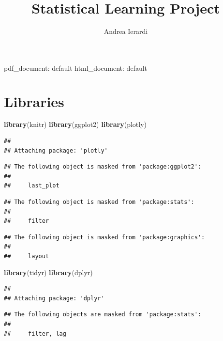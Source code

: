 \documentclass[
]{article}
\title{Statistical Learning Project}
\author{Andrea Ierardi}
\date{}
\newenvironment{Shaded}{\begin{snugshade}}{\end{snugshade}}
\newcommand{\KeywordTok}[1]{\textcolor[rgb]{0.13,0.29,0.53}{\textbf{#1}}}
\newcommand{\NormalTok}[1]{#1}
\begin{document}
\maketitle

pdf\_document: default html\_document: default

\hypertarget{libraries}{%
\section{Libraries}\label{libraries}}

\begin{Shaded}
\begin{Highlighting}[]
\KeywordTok{library}\NormalTok{(knitr)}
\KeywordTok{library}\NormalTok{(ggplot2)}
\KeywordTok{library}\NormalTok{(plotly)}
\end{Highlighting}
\end{Shaded}

\begin{verbatim}
## 
## Attaching package: 'plotly'
\end{verbatim}

\begin{verbatim}
## The following object is masked from 'package:ggplot2':
## 
##     last_plot
\end{verbatim}

\begin{verbatim}
## The following object is masked from 'package:stats':
## 
##     filter
\end{verbatim}

\begin{verbatim}
## The following object is masked from 'package:graphics':
## 
##     layout
\end{verbatim}

\begin{Shaded}
\begin{Highlighting}[]
\KeywordTok{library}\NormalTok{(tidyr)}
\KeywordTok{library}\NormalTok{(dplyr)}
\end{Highlighting}
\end{Shaded}

\begin{verbatim}
## 
## Attaching package: 'dplyr'
\end{verbatim}

\begin{verbatim}
## The following objects are masked from 'package:stats':
## 
##     filter, lag
\end{verbatim}
\end{document}
